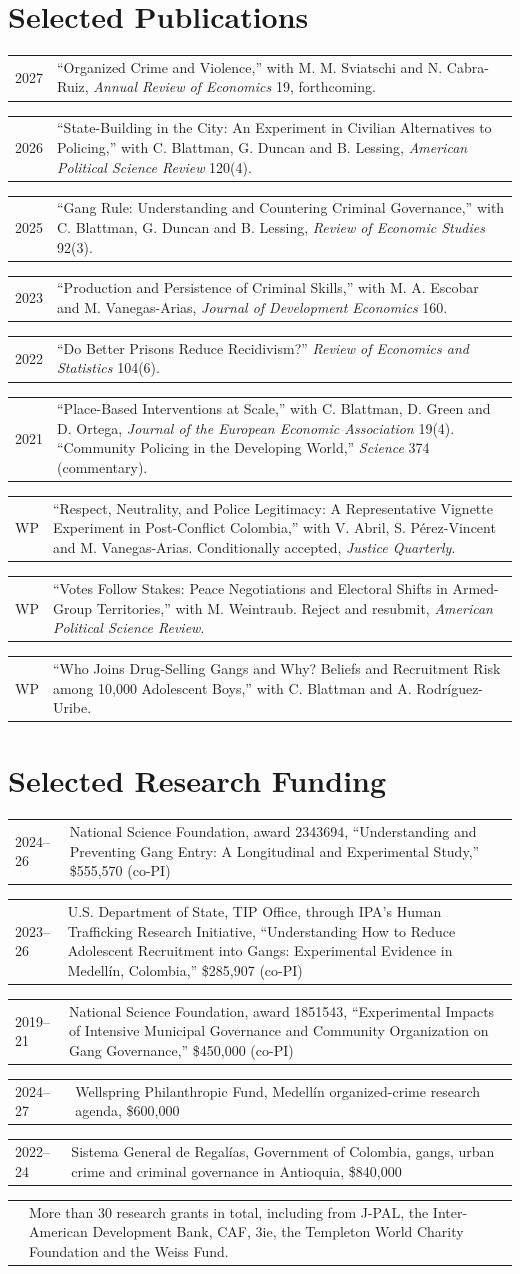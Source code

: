\documentclass[10pt]{article}
\makeatletter
\newlength{\datecolwidth}\setlength{\datecolwidth}{1.25cm}
\newlength{\gapwidth}\setlength{\gapwidth}{0.3cm}
\newlength{\maincolwidth}\setlength{\maincolwidth}{\dimexpr\textwidth-\datecolwidth-\gapwidth\relax}
\newcommand{\cventry}[2]{%
  \begin{tabular}[t]{@{}p{\datecolwidth}@{\hspace{\gapwidth}}p{\maincolwidth}@{}}#1 & #2 \\\end{tabular}\vspace{0.05ex}\par}
\makeatother
\begin{document}
\section*{Selected Publications}
\cventry{2027}{``Organized Crime and Violence,'' with M. M. Sviatschi and N. Cabra-Ruiz, \textit{Annual Review of Economics} 19, forthcoming.}
\cventry{2026}{``State-Building in the City: An Experiment in Civilian Alternatives to Policing,'' with C. Blattman, G. Duncan and B. Lessing, \textit{American Political Science Review} 120(4).}
\cventry{2025}{``Gang Rule: Understanding and Countering Criminal Governance,'' with C. Blattman, G. Duncan and B. Lessing, \textit{Review of Economic Studies} 92(3).}
\cventry{2023}{``Production and Persistence of Criminal Skills,'' with M. A. Escobar and M. Vanegas-Arias, \textit{Journal of Development Economics} 160.}
\cventry{2022}{``Do Better Prisons Reduce Recidivism?'' \textit{Review of Economics and Statistics} 104(6).}
\cventry{2021}{``Place-Based Interventions at Scale,'' with C. Blattman, D. Green and D. Ortega, \textit{Journal of the European Economic Association} 19(4). ``Community Policing in the Developing World,'' \textit{Science} 374 (commentary).}
\cventry{WP}{``Respect, Neutrality, and Police Legitimacy: A Representative Vignette Experiment in Post-Conflict Colombia,'' with V. Abril, S. P\'{e}rez-Vincent and M. Vanegas-Arias. Conditionally accepted, \textit{Justice Quarterly}.}
\cventry{WP}{``Votes Follow Stakes: Peace Negotiations and Electoral Shifts in Armed-Group Territories,'' with M. Weintraub. Reject and resubmit, \textit{American Political Science Review}.}
\cventry{WP}{``Who Joins Drug-Selling Gangs and Why? Beliefs and Recruitment Risk among 10,000 Adolescent Boys,'' with C. Blattman and A. Rodr\'{i}guez-Uribe.}

\section*{Selected Research Funding}
\cventry{2024--26}{National Science Foundation, award 2343694, ``Understanding and Preventing Gang Entry: A Longitudinal and Experimental Study,'' \$555,570 (co-PI)}
\cventry{2023--26}{U.S. Department of State, TIP Office, through IPA's Human Trafficking Research Initiative, ``Understanding How to Reduce Adolescent Recruitment into Gangs: Experimental Evidence in Medell\'{i}n, Colombia,'' \$285,907 (co-PI)}
\cventry{2019--21}{National Science Foundation, award 1851543, ``Experimental Impacts of Intensive Municipal Governance and Community Organization on Gang Governance,'' \$450,000 (co-PI)}
\cventry{2024--27}{Wellspring Philanthropic Fund, Medell\'{i}n organized-crime research agenda, \$600,000}
\cventry{2022--24}{Sistema General de Regal\'{i}as, Government of Colombia, gangs, urban crime and criminal governance in Antioquia, \$840,000}
\cventry{}{More than 30 research grants in total, including from J-PAL, the Inter-American Development Bank, CAF, 3ie, the Templeton World Charity Foundation and the Weiss Fund.}
\end{document}
